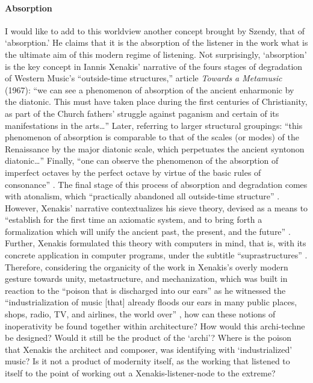 \paragraph{Absorption}
I would like to add to this worldview another concept brought by Szendy, that of `absorption.' He claims that it is the absorption of the listener in the work what is the ultimate aim of this modern regime of listening. Not surprisingly, `absorption' is the key concept in Iannis Xenakis' narrative of the fours stages of degradation of Western Music's ``outside-time structures,'' article \textit{Towards a Metamusic} (1967): ``we can see a phenomenon of absorption of the ancient enharmonic by the diatonic. This must have taken place during the first centuries of Christianity, as part of the Church fathers' struggle against paganism and certain of its manifestations in the arts\dots'' Later, referring to larger structural groupings: ``this phenomenon of absorption is comparable to that of the scales (or modes) of the Renaissance by the major diatonic scale, which perpetuates the ancient syntonon diatonic\dots'' Finally, ``one can observe the phenomenon of the absorption of imperfect octaves by the perfect octave by virtue of the basic rules of consonance'' \parencite[189-190]{Xen92:For}. The final stage of this process of absorption and degradation comes with atonalism, which ``practically abandoned all outside-time structure'' \parencite[193]{Xen92:For}. However, Xenakis' narrative contextualizes his sieve theory, devised as a means to ``establish for the first time an axiomatic system, and to bring forth a formalization which will unify the ancient past, the present, and the future'' \parencite[182]{Xen92:For}. Further, Xenakis formulated this theory with computers in mind, that is, with its concrete application in computer programs, under the subtitle ``suprastructures'' \parencite[200]{Xen92:For}. Therefore, considering the organicity of the work in Xenakis's overly modern gesture towards unity, metastructure, and mechanization, which was built in reaction to the ``poison that is discharged into our ears'' as he witnessed the ``industrialization of music [that] already floods our ears in many public places, shops, radio, TV, and airlines, the world over'' \parencite[200]{Xen92:For}, how can these notions of inoperativity be found together within architecture? How would this archi-techne be designed? Would it still be the product of the `archi'? Where is the poison that Xenakis the architect and  composer, was identifying with `industrialized' music? Is it not a product of modernity itself, as the working that listened to itself to the point of working out a Xenakis-listener-node to the extreme? 

